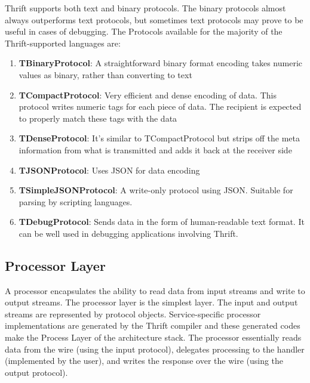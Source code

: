 \documentclass[9pt,twocolumn,twoside]{../../styles/osajnl}
\begin{document}
Thrift supports both text and binary protocols. The binary protocols almost always outperforms text protocols, but sometimes text protocols may prove to be useful in cases of debugging. The Protocols available for the majority of the Thrift-supported languages are:
\begin{enumerate}
	\item \textbf{TBinaryProtocol}: A straightforward binary format encoding takes numeric values as binary, rather than converting to text
	\item \textbf{TCompactProtocol}: Very efficient and dense encoding of data. This protocol writes numeric tags for each piece of data. The recipient is expected to properly match these tags with the data
	\item \textbf{TDenseProtocol}: It’s similar to TCompactProtocol but strips off the meta information from what is transmitted and adds it back at the receiver side
	\item \textbf{TJSONProtocol}: Uses JSON for data encoding
	\item \textbf{TSimpleJSONProtocol}: A write-only protocol using JSON. Suitable for parsing by scripting languages.
	\item \textbf{TDebugProtocol}: Sends data in the form of human-readable text format. It can be well used in debugging applications involving Thrift.
\end{enumerate}

\subsection{Processor Layer}
A processor encapsulates the ability to read data from input streams and write to output streams. The processor layer is the simplest layer. The input and output streams are represented by protocol objects. Service-specific processor implementations are generated by the Thrift compiler and these generated codes make the Process Layer of the architecture stack. The processor essentially reads data from the wire (using the input protocol), delegates processing to the handler (implemented by the user), and writes the response over the wire (using the output protocol).

	
\end{document}
